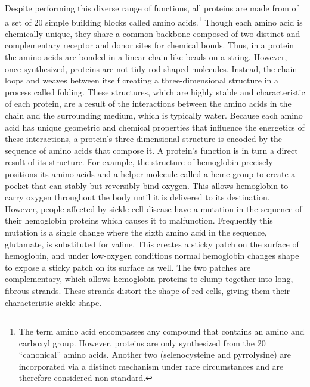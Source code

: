 Despite performing this diverse range of functions, all proteins are made from of a set of 20 simple building blocks called amino acids.\footnote{The term amino acid encompasses any compound that contains an amino and carboxyl group. However, proteins are only synthesized from the 20 ``canonical'' amino acids. Another two (selenocysteine and pyrrolysine) are incorporated via a distinct mechanism under rare circumstances and are therefore considered non-standard.} Though each amino acid is chemically unique, they share a common backbone composed of two distinct and complementary receptor and donor sites for chemical bonds. Thus, in a protein the amino acids are bonded in a linear chain like beads on a string. However, once synthesized, proteins are not tidy rod-shaped molecules. Instead, the chain loops and weaves between itself creating a three-dimensional structure in a process called folding. These structures, which are highly stable and characteristic of each protein, are a result of the interactions between the amino acids in the chain and the surrounding medium, which is typically water. Because each amino acid has unique geometric and chemical properties that influence the energetics of these interactions, a protein's three-dimensional structure is encoded by the sequence of amino acids that compose it. A protein's function is in turn a direct result of its structure. For example, the structure of hemoglobin precisely positions its amino acids and a helper molecule called a heme group to create a pocket that can stably but reversibly bind oxygen. This allows hemoglobin to carry oxygen throughout the body until it is delivered to its destination. However, people affected by sickle cell disease have a mutation in the sequence of their hemoglobin proteins which causes it to malfunction. Frequently this mutation is a single change where the sixth amino acid in the sequence, glutamate, is substituted for valine. This creates a sticky patch on the surface of hemoglobin, and under low-oxygen conditions normal hemoglobin changes shape to expose a sticky patch on its surface as well. The two patches are complementary, which allows hemoglobin proteins to clump together into long, fibrous strands. These strands distort the shape of red cells, giving them their characteristic sickle shape.

